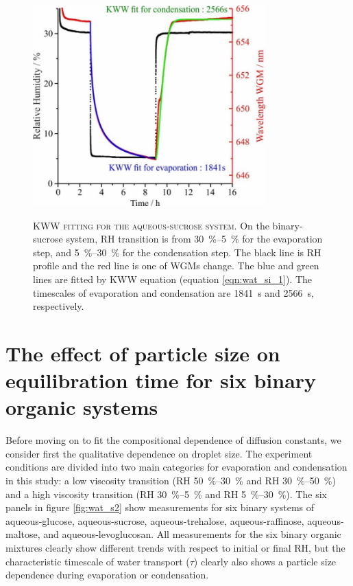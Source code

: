\begin{figure}
    \centering
    \caption[KWW fitting for the aqueous-sucrose system]{\textsc{KWW fitting for the aqueous-sucrose system}. On the binary-sucrose system, RH transition is from \SIrange{30}{5}{\percent} for the evaporation step, and \SIrange{5}{30}{\percent} for the condensation step. The black line is RH profile and the red line is one of WGMs change. The blue and green lines are fitted by KWW equation (equation \ref{eqn:wat_si_1}). The timescales of evaporation and condensation are \SI{1841}{\second} and \SI{2566}{\second}, respectively.}
    \includegraphics[width=0.8\textwidth]{chapters/water_hopping/figures/image003.jpg}
    \label{fig:wat_s1}
\end{figure}

\section{The effect of particle size on equilibration time for six binary organic systems}
Before moving on to fit the compositional dependence of diffusion constants, we consider first the qualitative dependence on droplet size. The experiment conditions are divided into two main categories for evaporation and condensation in this study: a low viscosity transition (RH \SIrange{50}{30}{\percent} and RH \SIrange{30}{50}{\percent}) and a high viscosity transition (RH \SIrange{30}{5}{\percent} and RH \SIrange{5}{30}{\percent}). The six panels in figure \ref{fig:wat_s2} show measurements for six binary systems of aqueous-glucose, aqueous-sucrose, aqueous-trehalose, aqueous-raffinose, aqueous-maltose, and aqueous-levoglucosan. All measurements for the six binary organic mixtures clearly show different trends with respect to initial or final RH, but the characteristic timescale of water transport ($\tau$) clearly also shows a particle size dependence during evaporation or condensation.

